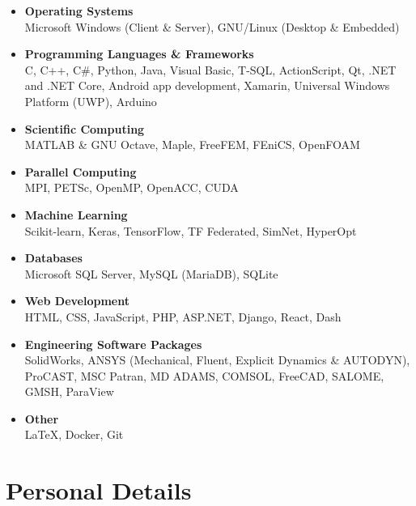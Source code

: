 \documentclass{cv}
\begin{document}
\begin{itemize}

\item
 \textbf{Operating Systems} \\ Microsoft Windows (Client \& Server), GNU/Linux (Desktop \& Embedded)
 \item
\textbf{Programming Languages \& Frameworks}\\  C, C++, C\#, Python, Java, Visual Basic, T-SQL, ActionScript, Qt, .NET and .NET Core, Android app development, Xamarin, Universal Windows Platform (UWP), Arduino
\item
\textbf{Scientific Computing}\\  MATLAB \& GNU Octave, Maple, FreeFEM, FEniCS, OpenFOAM
\item 
\textbf{Parallel Computing}\\ MPI, PETSc, OpenMP, OpenACC, CUDA
\item
\textbf{Machine Learning}\\ Scikit-learn, Keras, TensorFlow, TF Federated, SimNet, HyperOpt
\item
\textbf{Databases}\\ Microsoft SQL Server, MySQL (MariaDB), SQLite
\item
\textbf{Web Development} \\
HTML, CSS, JavaScript, PHP, ASP.NET, Django, React, Dash
\item
\textbf{Engineering Software Packages}\\ SolidWorks, ANSYS (Mechanical, Fluent, Explicit Dynamics \& AUTODYN), ProCAST, MSC Patran, MD ADAMS, COMSOL, FreeCAD, SALOME, GMSH, ParaView
\item
\textbf{Other}\\  \LaTeX{}, Docker, Git

\end{itemize}


\section{Personal Details}
\end{document}
